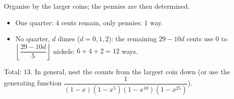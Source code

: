 Organise by the larger coins; the pennies are then determined.
\begin{itemize}
\item One quarter: $4$ cents remain, only pennies: $1$ way.
\item No quarter, $d$ dimes ($d=0,1,2$): the remaining $29-10d$ cents use $0$ to $\left\lfloor\dfrac{29-10d}{5}\right\rfloor$ nickels: $6+4+2=12$ ways.
\end{itemize}
Total: $\boxed{13}$. In general, nest the counts from the largest coin down (or use the generating function $\dfrac{1}{(1-x)(1-x^5)(1-x^{10})(1-x^{25})}$).
